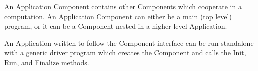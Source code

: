 %


An Application Component contains other Components which
cooperate in a computation. An Application Component can 
either be a main (top level) program, or it can be a
Component nested in a higher level Application. 

An Application written to follow the Component interface
can be run standalone with a generic driver program which creates
the Component and calls the Init, Run, and Finalize methods.

